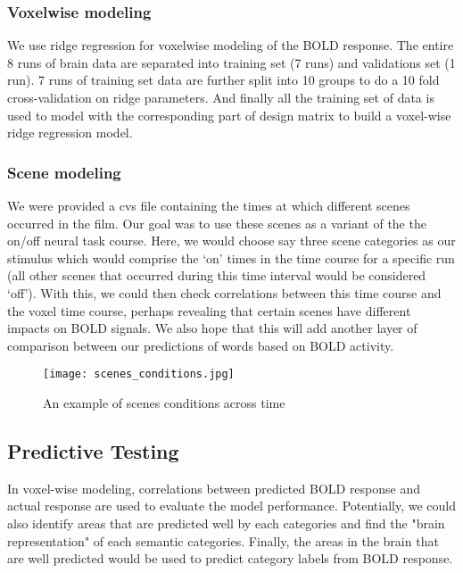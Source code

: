 \subsubsection{Voxelwise modeling}
\par We use ridge regression for voxelwise modeling of the BOLD response. The entire 8 runs of brain data are separated into training set (7 runs) and validations set (1 run). 7 runs of training set data are further split into 10 groups to do a 10 fold cross-validation on ridge parameters. And finally all the training set of data is used to model with the corresponding part of design matrix to build a voxel-wise ridge regression model. 

\subsubsection{Scene modeling}
\par We were provided a cvs file containing the times at which different scenes occurred in the film. Our goal was to use these scenes as a variant of the the on/off neural task course. Here, we would choose say three scene categories as our stimulus which would comprise the ‘on’ times in the time course for a specific run (all other scenes that occurred during this time interval would be considered ‘off’). With this, we could then check correlations between this time course and the voxel time course, perhaps revealing that certain scenes have different impacts on BOLD signals. We also hope that this will add another layer of comparison between our predictions of words based on BOLD activity.
\begin{figure}[!htbp]
\centering
\texttt{[image: scenes\_conditions.jpg]}
\caption{\label{fig:scenes_conditions} An example of scenes conditions across time}
\end{figure}

\subsection{Predictive Testing}
\par In voxel-wise modeling, correlations between predicted BOLD response and actual response are used to evaluate the model performance. Potentially, we could also identify areas that are predicted well by each categories and find the "brain representation" of each semantic categories. Finally, the areas in the brain that are well predicted would be used to predict category labels from BOLD response.

